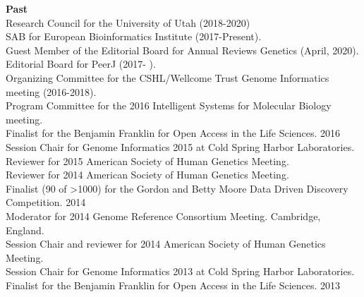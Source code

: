 \documentclass[margin,line]{cv}
\begin{document}
\begin{resume}
    \textbf{Past}\\
    Research Council for the University of Utah (2018-2020) \\\vspace{1mm}%
    SAB for European Bioinformatics Institute (2017-Present). \\\vspace{1mm}%
    Guest Member of the Editorial Board for Annual Reviews Genetics (April, 2020). \\\vspace{1mm}%
    Editorial Board for PeerJ (2017- ). \\\vspace{1mm}%
    Organizing Committee for the CSHL/Wellcome Trust Genome Informatics meeting (2016-2018). \\\vspace{1mm}%
    Program Committee for the 2016 Intelligent Systems for Molecular Biology meeting. \\\vspace{1mm}%
    Finalist for the Benjamin Franklin for Open Access in the Life Sciences. 2016 \\\vspace{1mm}%
    Session Chair for Genome Informatics 2015 at Cold Spring Harbor Laboratories. \\\vspace{1mm}%
    Reviewer for 2015 American Society of Human Genetics Meeting. \\\vspace{1mm}%
    Reviewer for 2014 American Society of Human Genetics Meeting. \\\vspace{1mm}%
    Finalist (90 of \textgreater 1000) for the Gordon and Betty Moore Data Driven Discovery Competition. 2014 \\\vspace{1mm}%
    Moderator for 2014 Genome Reference Consortium Meeting. Cambridge, England. \\\vspace{1mm}%
    Session Chair and reviewer for 2014 American Society of Human Genetics Meeting. \\\vspace{1mm}%
    Session Chair for Genome Informatics 2013 at Cold Spring Harbor Laboratories. \\\vspace{1mm}%
	Finalist for the Benjamin Franklin for Open Access in the Life Sciences. 2013 \\\vspace{1mm}%

\end{resume}
\end{document}
